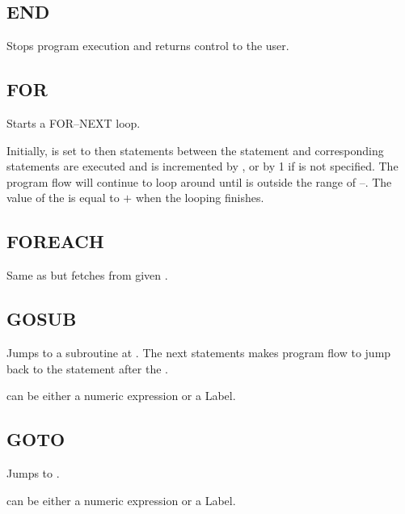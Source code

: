     \subsection{END}
        \par
        Stops program execution and returns control to the user.
    \subsection{FOR}
        \par
        Starts a FOR--NEXT loop.\par
        Initially,  is set to  then statements between the  statement and corresponding  statements are executed and  is incremented by , or by 1 if  is not specified. The program flow will continue to loop around until  is outside the range of --. The value of the  is equal to $+$ when the looping finishes.
    \subsection{FOREACH}
        \par
        Same as  but fetches  from given .
    \subsection{GOSUB}
        \par
        Jumps to a subroutine at . The next  statements makes program flow to jump back to the statement after the .\par
         can be either a numeric expression or a Label.
    \subsection{GOTO}
        \par
        Jumps to .\par
         can be either a numeric expression or a Label.
